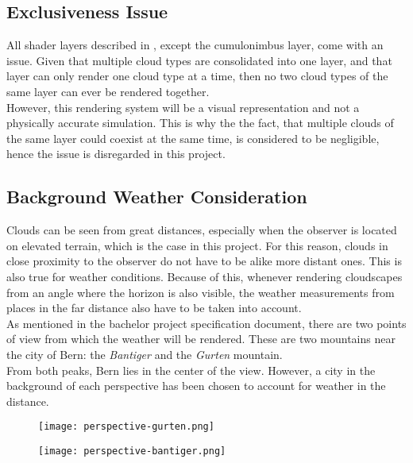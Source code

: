 \subsection{Exclusiveness Issue}
All \gls{shader} layers described in , except the cumulonimbus layer, come with an issue.
Given that multiple cloud types are consolidated into one layer, and that layer can only render one cloud type at a time, then no two cloud types of the same layer can ever be rendered together.
\\
However, this rendering system will be a visual representation and not a physically accurate simulation.
This is why the the fact, that multiple clouds of the same layer could coexist at the same time, is considered to be negligible, hence the issue is disregarded in this project.

\pagebreak

\subsection{Background Weather Consideration}
Clouds can be seen from great distances, especially when the observer is located on elevated terrain, which is the case in this project.
For this reason, clouds in close proximity to the observer do not have to be alike more distant ones.
This is also true for weather conditions.
Because of this, whenever rendering cloudscapes from an angle where the horizon is also visible, the weather measurements from places in the far distance also have to be taken into account.
\\
As mentioned in the bachelor project specification document, there are two points of view from which the weather will be rendered.
These are two mountains near the city of Bern: the \emph{Bantiger} and the \emph{Gurten} mountain.
\\
From both peaks, Bern lies in the center of the view. However, a city in the background of each perspective has been chosen to account for weather in the distance.

\begin{figure}[H]
    \centering
        \begin{minipage}{0.47\linewidth}
            \texttt{[image: perspective-gurten.png]}
            \label{img:noise:fbm10_1}
        \end{minipage}
    \hfill
        \begin{minipage}{0.47\linewidth}
            \texttt{[image: perspective-bantiger.png]}
            \label{img:noise:fbm10_2}
        \end{minipage}
\end{figure}

